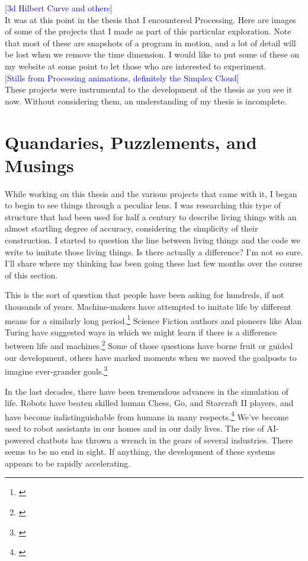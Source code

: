 \documentclass[12pt,twoside]{reedthesis}
\begin{document}
	\textcolor{blue}{[3d Hilbert Curve and others]}\\
	
	It was at this point in the thesis that I encountered Processing. Here are images of some of the projects that I made as part of this particular exploration. Note that most of these are snapshots of a program in motion, and a lot of detail will be lost when we remove the time dimension. I would like to put some of these on my website at some point to let those who are interested to experiment.\\
	
	\textcolor{blue}{[Stills from Processing animations, definitely the Simplex Cloud]}\\
	
	These projects were instrumental to the development of the thesis as you see it now. Without considering them, an understanding of my thesis is incomplete.

\section{Quandaries, Puzzlements, and Musings}
\label{Questions}

	While working on this thesis and the various projects that came with it, I began to begin to see things through a peculiar lens. I was researching this type of structure that had been used for half a century to describe living things with an almost startling degree of accuracy, considering the simplicity of their construction. I started to question the line between living things and the code we write to imitate those living things. Is there actually a difference? I'm not so sure. I'll share where my thinking has been going these last few months over the course of this section.
	
	This is the sort of question that people have been asking for hundreds, if not thousands of years. Machine-makers have attempted to imitate life by different means for a similarly long period.\footnote{\cite{riskin2016}} Science Fiction authors and pioneers like Alan Turing have suggested ways in which we might learn if there is a difference between life and machines.\footnote{\cite{turing1936}} Some of those questions have borne fruit or guided our development, others have marked moments when we moved the goalposts to imagine ever-grander goals.\footnote{\cite{theory2004}}
	
	In the last decades, there have been tremendous advances in the simulation of life. Robots have beaten skilled human Chess, Go, and Starcraft II players, and have become indistinguishable from humans in many respects.\footnote{\cite{gamerAI2019}} We've become used to robot assistants in our homes and in our daily lives. The rise of AI-powered chatbots has thrown a wrench in the gears of several industries. There seems to be no end in sight. If anything, the development of these systems appears to be rapidly accelerating.\\
	
\end{document}
